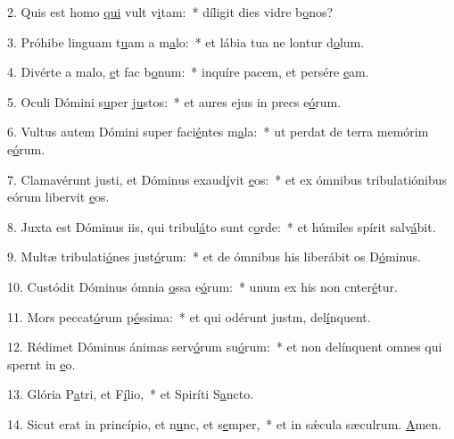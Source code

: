 2. Quis est homo \uline{qui} vult v\uline{i}tam:~* díligit dies vidre b\uline{o}nos?\par 
3. Próhibe linguam t\uline{u}am a m\uline{a}lo:~* et lábia tua ne lontur d\uline{o}lum.\par 
4. Divérte a malo, \uline{e}t fac b\uline{o}num:~* inquíre pacem, et persére \uline{e}am.\par 
5. Oculi Dómini s\uline{u}per j\uline{u}stos:~* et aures ejus in precs e\uline{ó}rum.\par 
6. Vultus autem Dómini super faci\uline{é}ntes m\uline{a}la:~* ut perdat de terra memórim e\uline{ó}rum.\par 
7. Clamavérunt justi, et Dóminus exaud\uline{í}vit \uline{e}os:~* et ex ómnibus tribulatiónibus eórum libervit \uline{e}os.\par 
8. Juxta est Dóminus iis, qui tribul\uline{á}to sunt c\uline{o}rde:~* et húmiles spírit salv\uline{á}bit.\par 
9. Multæ tribulati\uline{ó}nes just\uline{ó}rum:~* et de ómnibus his liberábit os D\uline{ó}minus.\par 
10. Custódit Dóminus ómnia \uline{o}ssa e\uline{ó}rum:~* unum ex his non cnter\uline{é}tur.\par 
11. Mors peccat\uline{ó}rum p\uline{é}ssima:~* et qui odérunt justm, del\uline{í}nquent.\par 
12. Rédimet Dóminus ánimas serv\uline{ó}rum su\uline{ó}rum:~* et non delínquent omnes qui spernt in \uline{e}o.\par 
13. Glória P\uline{a}tri, et F\uline{í}lio,~* et Spiríti S\uline{a}ncto.\par 
14. Sicut erat in princípio, et n\uline{u}nc, et s\uline{e}mper,~* et in sǽcula sæculrum. \uline{A}men.\par 

